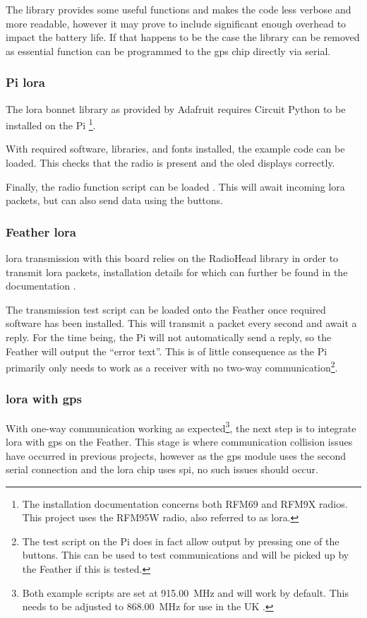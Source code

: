 The library provides some useful functions and makes the code less verbose and more readable,
however it may prove to include significant enough overhead to impact the battery life.
If that happens to be the case the library can be removed as essential function
can be programmed to the \acrshort{gps} chip directly via serial.

\subsubsection{Pi \gls{lora}}
The \gls{lora} bonnet library as provided by Adafruit requires Circuit Python to be installed
on the Pi \cite{adafruit:circuitpython,adafruit:lorabonnet}\footnote{The installation documentation
    concerns both RFM69 and RFM9X radios. This project uses the RFM95W radio, also referred to
    as \gls{lora}.}.

With required software, libraries, and fonts installed, the example code \cite{adafruit:rfm95check}
can be loaded. This checks that the radio is present and the \acrshort{oled} displays correctly.

Finally, the radio function script can be loaded \cite{adafruit:radiopy}. This will await
incoming \gls{lora} packets, but can also send data using the buttons.

\subsubsection{Feather \gls{lora}}

\gls{lora} transmission with this board relies on the RadioHead library \cite{airspayce:main} in order to
transmit \gls{lora} packets, installation details for which can further be found in the
documentation \cite{adafruit:loram0}.

The transmission test script can be loaded onto the Feather \cite{adafruit:feathertx} once required software
has been installed. This will transmit a packet every second and await a reply.
For the time being, the Pi will not automatically send a reply, so the Feather will output
the ``error text''. This is of little consequence as the Pi
primarily only needs to work as a receiver with no two-way communication\footnote{The test script on the
    Pi does in fact allow output by pressing one of the buttons. This can be used to test communications
    and will be picked up by the Feather if this is tested.}.

\subsubsection{\gls{lora} with \acrshort{gps}}
With one-way communication working as expected\footnote{Both example scripts are set at \qty{915.00}{\MHz}
    and will work by default. This needs to be adjusted to \qty{868.00}{\MHz} for use in the UK
    \cite{ofcom:licenceexempt}.}, the next step is to integrate \gls{lora} with \acrshort{gps} on the Feather. This
stage is where communication collision issues have occurred in previous projects,
however as the \acrshort{gps} module uses the second serial connection and the \gls{lora} chip uses \acrshort{spi}, no such
issues should occur.

